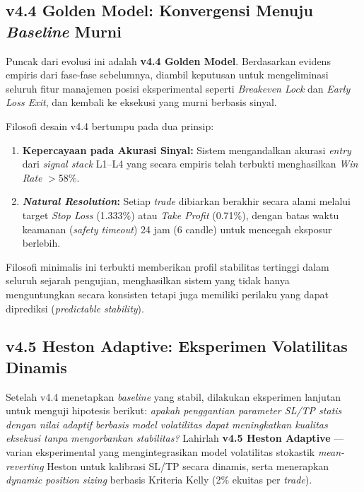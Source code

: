 \subsection{v4.4 Golden Model: Konvergensi Menuju \textit{Baseline} Murni}

Puncak dari evolusi ini adalah \textbf{v4.4 Golden Model}. Berdasarkan evidens empiris dari fase-fase sebelumnya, diambil keputusan untuk mengeliminasi seluruh fitur manajemen posisi eksperimental seperti \textit{Breakeven Lock} dan \textit{Early Loss Exit}, dan kembali ke eksekusi yang murni berbasis sinyal.

Filosofi desain v4.4 bertumpu pada dua prinsip:
\begin{enumerate}
    \item \textbf{Kepercayaan pada Akurasi Sinyal:} Sistem mengandalkan akurasi \textit{entry} dari \textit{signal stack} L1--L4 yang secara empiris telah terbukti menghasilkan \textit{Win Rate} $>$58\%.
    \item \textbf{\textit{Natural Resolution}:} Setiap \textit{trade} dibiarkan berakhir secara alami melalui target \textit{Stop Loss} (1.333\%) atau \textit{Take Profit} (0.71\%), dengan batas waktu keamanan (\textit{safety timeout}) 24 jam (6 candle) untuk mencegah eksposur berlebih.
\end{enumerate}

Filosofi minimalis ini terbukti memberikan profil stabilitas tertinggi dalam seluruh sejarah pengujian, menghasilkan sistem yang tidak hanya menguntungkan secara konsisten tetapi juga memiliki perilaku yang dapat diprediksi (\textit{predictable stability}).

\subsection{v4.5 Heston Adaptive: Eksperimen Volatilitas Dinamis}
\label{subsec:v45_heston}

Setelah v4.4 menetapkan \textit{baseline} yang stabil, dilakukan eksperimen lanjutan untuk menguji hipotesis berikut: \textit{apakah penggantian parameter SL/TP statis dengan nilai adaptif berbasis model volatilitas dapat meningkatkan kualitas eksekusi tanpa mengorbankan stabilitas?} Lahirlah \textbf{v4.5 Heston Adaptive} --- varian eksperimental yang mengintegrasikan model volatilitas stokastik \textit{mean-reverting} Heston untuk kalibrasi SL/TP secara dinamis, serta menerapkan \textit{dynamic position sizing} berbasis Kriteria Kelly (2\% ekuitas per \textit{trade}).

